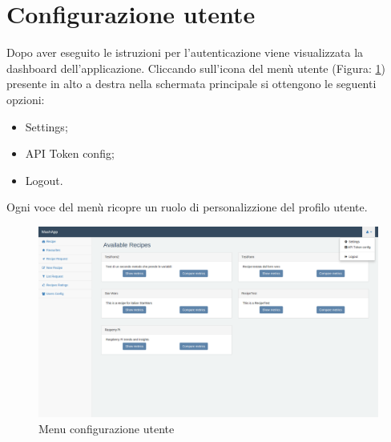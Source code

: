 %

\section{Configurazione utente} %
\label{sec:configurazione_utente}
	Dopo aver eseguito le istruzioni per l'autenticazione viene visualizzata la dashboard dell’applicazione.\newline
	Cliccando sull'icona del menù utente (Figura: \ref{fig:menu_configurazione_utente}) presente in alto a destra nella schermata principale si ottengono le seguenti opzioni:
	\begin{itemize}
		\item Settings;
		\item API Token config;
		\item Logout.
	\end{itemize}
	Ogni voce del menù ricopre un ruolo di personalizzione del profilo utente.
	\begin{figure}[htbp]
		\centering
		\centerline{\includegraphics[width=14cm]{images/menu_configurazione_utente.png}}
		\caption{Menu configurazione utente}
		\label{fig:menu_configurazione_utente}
	\end{figure}


